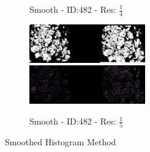 \documentclass[a4paper,10pt,oneside]{article}
\begin{document}
\begin{figure}[hbtp]
\begin{subfigure}[b]{5cm}
    \caption{Smooth - ID:482 - Res: $\frac{1}{4}$}
  \end{subfigure}
  \begin{subfigure}[b]{5cm}
    \includegraphics[width=5cm]{visualization/results/smoothhistogram/res_reduce_5/Region_0_PO14-00482B3_1_2_201404171123.png}
    \includegraphics[width=5cm]{visualization/results/smoothhistogram/res_reduce_5/Region_1_PO14-00482B3_1_2_201404171123.png}
    \caption{Smooth - ID:482 - Res: $\frac{1}{5}$}
  \end{subfigure}
  \caption{Smoothed Histogram Method}
\end{figure}
\end{document}
